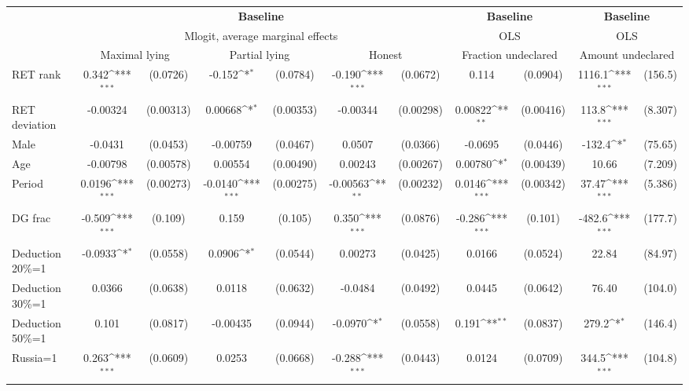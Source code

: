 \def\sym#1{\ifmmode^{#1}\else\(^{#1}\)\fi}
\begin{tabular}{l|cccccc|cc|cc}
\hline\hline
&\multicolumn{6}{c|}{\bf Baseline}&\multicolumn{2}{c|}{\bf Baseline}&\multicolumn{2}{c}{\bf Baseline}\\ &\multicolumn{6}{c|}{Mlogit, average marginal effects }&\multicolumn{2}{c|}{OLS}&\multicolumn{2}{c}{OLS}\\
                &\multicolumn{2}{c}{Maximal lying}&\multicolumn{2}{c}{Partial lying}&\multicolumn{2}{c}{Honest}  &\multicolumn{2}{c}{Fraction undeclared}&\multicolumn{2}{c}{Amount undeclared}\\
\hline
RET rank        &    0.342\sym{***}& (0.0726)&   -0.152\sym{*}  & (0.0784)&   -0.190\sym{***}& (0.0672)&    0.114         & (0.0904)&   1116.1\sym{***}&  (156.5)\\
RET deviation   & -0.00324         &(0.00313)&  0.00668\sym{*}  &(0.00353)& -0.00344         &(0.00298)&  0.00822\sym{**} &(0.00416)&    113.8\sym{***}&  (8.307)\\
Male            &  -0.0431         & (0.0453)& -0.00759         & (0.0467)&   0.0507         & (0.0366)&  -0.0695         & (0.0446)&   -132.4\sym{*}  &  (75.65)\\
Age             & -0.00798         &(0.00578)&  0.00554         &(0.00490)&  0.00243         &(0.00267)&  0.00780\sym{*}  &(0.00439)&    10.66         &  (7.209)\\
Period          &   0.0196\sym{***}&(0.00273)&  -0.0140\sym{***}&(0.00275)& -0.00563\sym{**} &(0.00232)&   0.0146\sym{***}&(0.00342)&    37.47\sym{***}&  (5.386)\\
DG frac         &   -0.509\sym{***}&  (0.109)&    0.159         &  (0.105)&    0.350\sym{***}& (0.0876)&   -0.286\sym{***}&  (0.101)&   -482.6\sym{***}&  (177.7)\\
Deduction 20\%=1&  -0.0933\sym{*}  & (0.0558)&   0.0906\sym{*}  & (0.0544)&  0.00273         & (0.0425)&   0.0166         & (0.0524)&    22.84         &  (84.97)\\
Deduction 30\%=1&   0.0366         & (0.0638)&   0.0118         & (0.0632)&  -0.0484         & (0.0492)&   0.0445         & (0.0642)&    76.40         &  (104.0)\\
Deduction 50\%=1&    0.101         & (0.0817)& -0.00435         & (0.0944)&  -0.0970\sym{*}  & (0.0558)&    0.191\sym{**} & (0.0837)&    279.2\sym{*}  &  (146.4)\\
Russia=1        &    0.263\sym{***}& (0.0609)&   0.0253         & (0.0668)&   -0.288\sym{***}& (0.0443)&   0.0124         & (0.0709)&    344.5\sym{***}&  (104.8)\\

\end{tabular}
